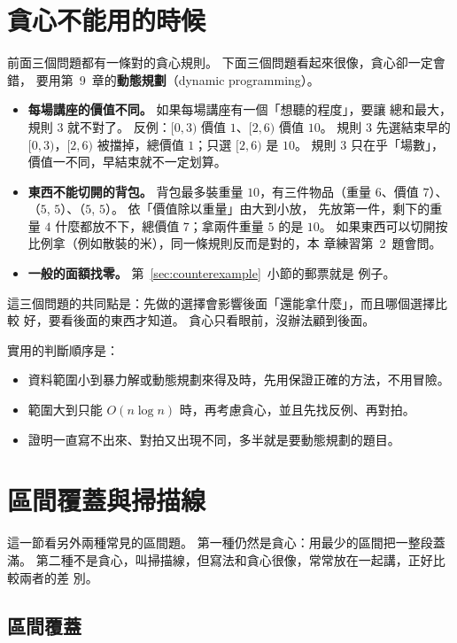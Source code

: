 \section{貪心不能用的時候}
\label{sec:greedy-fails}

前面三個問題都有一條對的貪心規則。 下面三個問題看起來很像，貪心卻一定會錯，
要用第~9~章的\textbf{動態規劃}（dynamic programming）。

\begin{itemize}
\item \textbf{每場講座的價值不同。} 如果每場講座有一個「想聽的程度」，要讓
總和最大，規則 3 就不對了。 反例：$[0, 3)$ 價值 $1$、$[2, 6)$ 價值 $10$。
規則 3 先選結束早的 $[0, 3)$，$[2, 6)$ 被擋掉，總價值 $1$；只選 $[2, 6)$ 是
$10$。 規則 3 只在乎「場數」，價值一不同，早結束就不一定划算。
\item \textbf{東西不能切開的背包。} 背包最多裝重量 $10$，有三件物品（重量
$6$、價值 $7$）、（$5$, $5$）、（$5$, $5$）。 依「價值除以重量」由大到小放，
先放第一件，剩下的重量 $4$ 什麼都放不下，總價值 $7$；拿兩件重量 $5$ 的是
$10$。 如果東西可以切開按比例拿（例如散裝的米），同一條規則反而是對的，本
章練習第~2~題會問。
\item \textbf{一般的面額找零。} 第~\ref{sec:counterexample}~小節的郵票就是
例子。
\end{itemize}

這三個問題的共同點是：先做的選擇會影響後面「還能拿什麼」，而且哪個選擇比較
好，要看後面的東西才知道。 貪心只看眼前，沒辦法顧到後面。

實用的判斷順序是：

\begin{itemize}
\item 資料範圍小到暴力解或動態規劃來得及時，先用保證正確的方法，不用冒險。
\item 範圍大到只能 $O(n \log n)$ 時，再考慮貪心，並且先找反例、再對拍。
\item 證明一直寫不出來、對拍又出現不同，多半就是要動態規劃的題目。
\end{itemize}

\section{區間覆蓋與掃描線}
\label{sec:cover-sweep}

這一節看另外兩種常見的區間題。 第一種仍然是貪心：用最少的區間把一整段蓋滿。
第二種不是貪心，叫掃描線，但寫法和貪心很像，常常放在一起講，正好比較兩者的差
別。

\subsection{區間覆蓋}

